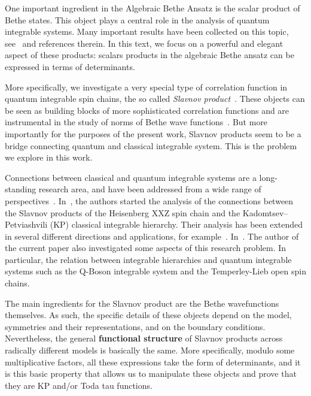 \documentclass[a4paper,12pt]{amsart}
\begin{document}
One important ingredient in the Algebraic Bethe Ansatz is the scalar
product of Bethe states. This object plays a central role in the
analysis of quantum integrable systems. Many important results have
been collected on this topic, see~\cite{Korepin:1993kvr} and
references therein. In this text, we focus on a powerful and elegant
aspect of these products: scalars products in the algebraic Bethe
ansatz can be expressed in terms of determinants.

More specifically, we investigate a very special type of correlation
function in quantum integrable spin chains, the so called
\emph{Slavnov product}~\cite{Slavnov1989}. These objects can be seen
as building blocks of more sophisticated correlation functions and are
instrumental in the study of norms of Bethe wave
functions~\cite{Korepin:1993kvr}. But more importantly for the
purposes of the present work, Slavnov products seem to be a bridge
connecting quantum and classical integrable system. This is the
problem we explore in this work.

Connections between classical and quantum integrable systems are a
long-standing research area, and have been addressed from a wide range
of perspectives~\cite{Wu:1975mw, Its:1992bj, korepin2000the, Foda2009,
  Alexandrov:2011aa}.  In~\cite{Foda:2009zz}, the authors started the
analysis of the connections between the Slavnov products of the
Heisenberg XXZ spin chain and the Kadomtsev–Petviashvili (KP)
classical integrable hierarchy. Their analysis has been extended in
several different directions and applications, for
example~\cite{Wheeler:2010vmq, Foda:2010, Takasaki:2010qm,
  Foda:2012wn, Foda:2012wf}.  In~\cite{Araujo:2021ghu,
  Araujo:2024klz}. The author of the current paper also investigated
some aspects of this research problem. In particular, the relation
between integrable hierarchies and quantum integrable systems such as
the Q-Boson integrable system and the Temperley-Lieb open spin chains.

The main ingredients for the Slavnov product are the Bethe
wavefunctions themselves. As such, the specific details of these
objects depend on the model, symmetries and their representations, and
on the boundary conditions. Nevertheless, the general
\textbf{functional structure} of Slavnov products across radically
different models is basically the same. More specifically, modulo some
multiplicative factors, all these expressions take the form of
determinants, and it is this basic property that allows us to
manipulate these objects and prove that they are KP and/or Toda tau
functions.
\end{document}
